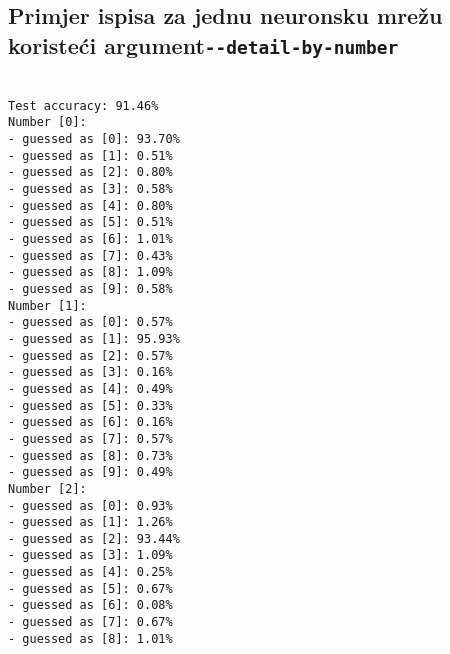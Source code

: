 \subsection*{Primjer ispisa za jednu neuronsku mrežu koristeći argument\newline\texttt{-{}-detail-by-number}}
\scriptsize
\texttt{
\\
Test accuracy: 91.46\%\\
Number [0]:\\
- guessed as [0]: 93.70\%\\
- guessed as [1]: 0.51\%\\
- guessed as [2]: 0.80\%\\
- guessed as [3]: 0.58\%\\
- guessed as [4]: 0.80\%\\
- guessed as [5]: 0.51\%\\
- guessed as [6]: 1.01\%\\
- guessed as [7]: 0.43\%\\
- guessed as [8]: 1.09\%\\
- guessed as [9]: 0.58\%\\
\newline
Number [1]:\\
- guessed as [0]: 0.57\%\\
- guessed as [1]: 95.93\%\\
- guessed as [2]: 0.57\%\\
- guessed as [3]: 0.16\%\\
- guessed as [4]: 0.49\%\\
- guessed as [5]: 0.33\%\\
- guessed as [6]: 0.16\%\\
- guessed as [7]: 0.57\%\\
- guessed as [8]: 0.73\%\\
- guessed as [9]: 0.49\%\\
\newline
Number [2]:\\
- guessed as [0]: 0.93\%\\
- guessed as [1]: 1.26\%\\
- guessed as [2]: 93.44\%\\
- guessed as [3]: 1.09\%\\
- guessed as [4]: 0.25\%\\
- guessed as [5]: 0.67\%\\
- guessed as [6]: 0.08\%\\
- guessed as [7]: 0.67\%\\
- guessed as [8]: 1.01\%\\
}
